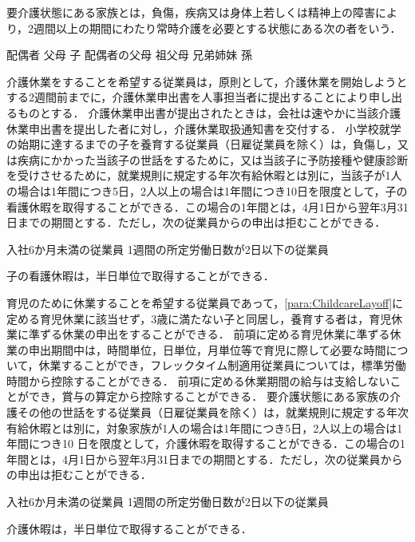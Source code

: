 \documentclass[11pt,a4paper]{jsarticle}
\begin{document}
\term 要介護状態にある家族とは，負傷，疾病又は身体上若しくは精神上の障害により，2週間以上の期間にわたり常時介護を必要とする状態にある次の者をいう．
\begin{enumerate}
	\itm 配偶者
	\itm 父母
	\itm 子
	\itm 配偶者の父母
	\itm 祖父母
	\itm 兄弟姉妹
	\itm 孫
\end{enumerate}

\term 介護休業をすることを希望する従業員は，原則として，介護休業を開始しようとする2週間前までに，介護休業申出書を人事担当者に提出することにより申し出るものとする．
\term 介護休業申出書が提出されたときは，会社は速やかに当該介護休業申出書を提出した者に対し，介護休業取扱通知書を交付する．
小学校就学の始期に達するまでの子を養育する従業員（日雇従業員を除く）は，負傷し，又は疾病にかかった当該子の世話をするために，又は当該子に予防接種や健康診断を受けさせるために，就業規則に規定する年次有給休暇とは別に，当該子が1人の場合は1年間につき5日，2人以上の場合は1年間につき10日を限度として，子の看護休暇を取得することができる．この場合の1年間とは，4月1日から翌年3月31日までの期間とする．ただし，次の従業員からの申出は拒むことができる．
\label{para:ChildNursingAbsence}
\begin{enumerate}
	\itm 入社6か月未満の従業員
	\itm 1週間の所定労働日数が2日以下の従業員
\end{enumerate}
\term 子の看護休暇は，半日単位で取得することができる．

育児のために休業することを希望する従業員であって，\ref{para:ChildcareLayoff}に定める育児休業に該当せず，3歳に満たない子と同居し，養育する者は，育児休業に準ずる休業の申出をすることができる．
\term
前項に定める育児休業に準ずる休業の申出期間中は，時間単位，日単位，月単位等で育児に際して必要な時間について，休業することができ，フレックタイム制適用従業員については，標準労働時間から控除することができる．
\term
前項に定める休業期間の給与は支給しないことができ，賞与の算定から控除することができる．
要介護状態にある家族の介護その他の世話をする従業員（日雇従業員を除く）は，就業規則に規定する年次有給休暇とは別に，対象家族が1人の場合は1年間につき5日，2人以上の場合は1年間につき10 日を限度として，介護休暇を取得することができる．この場合の1年間とは，4月1日から翌年3月31日までの期間とする．ただし，次の従業員からの申出は拒むことができる．
\label{para:NursingAbsence}
\begin{enumerate}
	\itm 	入社6か月未満の従業員
	\itm 	1週間の所定労働日数が2日以下の従業員
\end{enumerate}

\term 介護休暇は，半日単位で取得することができる．
\end{document}
